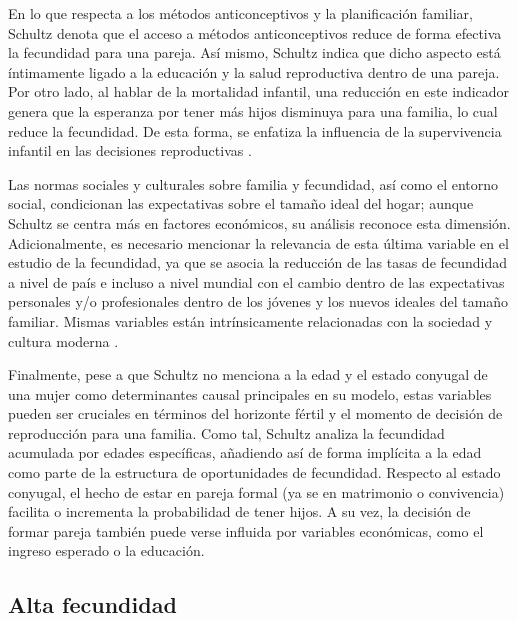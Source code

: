 \documentclass[Royal,times,sageh]{sagej}
\begin{document}
En lo que respecta a los métodos anticonceptivos y la planificación
familiar, Schultz denota que el acceso a métodos anticonceptivos reduce
de forma efectiva la fecundidad para una pareja. Así mismo, Schultz
indica que dicho aspecto está íntimamente ligado a la educación y la
salud reproductiva dentro de una pareja. Por otro lado, al hablar de la
mortalidad infantil, una reducción en este indicador genera que la
esperanza por tener más hijos disminuya para una familia, lo cual reduce
la fecundidad. De esta forma, se enfatiza la influencia de la
supervivencia infantil en las decisiones reproductivas
\citep{schultz2006fertility}.

Las normas sociales y culturales sobre familia y fecundidad, así como el
entorno social, condicionan las expectativas sobre el tamaño ideal del
hogar; aunque Schultz se centra más en factores económicos, su análisis
reconoce esta dimensión. Adicionalmente, es necesario mencionar la
relevancia de esta última variable en el estudio de la fecundidad, ya
que se asocia la reducción de las tasas de fecundidad a nivel de país e
incluso a nivel mundial con el cambio dentro de las expectativas
personales y/o profesionales dentro de los jóvenes y los nuevos ideales
del tamaño familiar. Mismas variables están intrínsicamente relacionadas
con la sociedad y cultura moderna \citep{enriquez2017determinantes}.

Finalmente, pese a que Schultz no menciona a la edad y el estado
conyugal de una mujer como determinantes causal principales en su
modelo, estas variables pueden ser cruciales en términos del horizonte
fértil y el momento de decisión de reproducción para una familia. Como
tal, Schultz analiza la fecundidad acumulada por edades específicas,
añadiendo así de forma implícita a la edad como parte de la estructura
de oportunidades de fecundidad. Respecto al estado conyugal, el hecho de
estar en pareja formal (ya se en matrimonio o convivencia) facilita o
incrementa la probabilidad de tener hijos. A su vez, la decisión de
formar pareja también puede verse influida por variables económicas,
como el ingreso esperado o la educación.

\subsection{Alta fecundidad}\label{alta-fecundidad}
\end{document}

